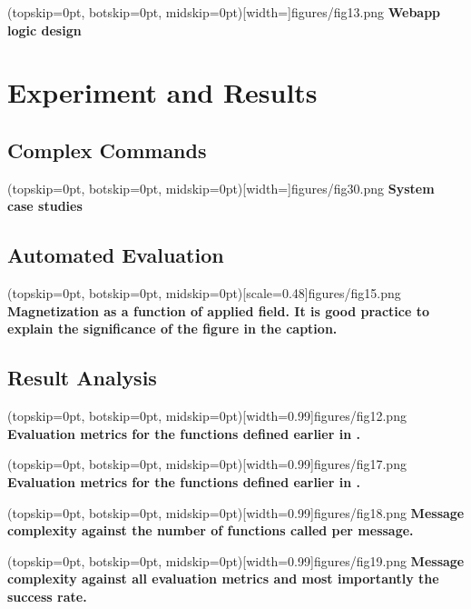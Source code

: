 \documentclass{ieeeaccess}
\begin{document}
\Figure[t!](topskip=0pt, botskip=0pt,
midskip=0pt)[width=\textwidth]{{figures/fig13.png}}
{ \textbf{Webapp logic design}\label{fig5}}

\section{Experiment and Results}
\label{sec:guidelines}

\subsection{Complex Commands}
\Figure[t!](topskip=0pt, botskip=0pt,
midskip=0pt)[width=\textwidth]{{figures/fig30.png}}
{ \textbf{System case studies}\label{fig6}}


\subsection{Automated Evaluation}
\Figure[t!](topskip=0pt, botskip=0pt, midskip=0pt)[scale=0.48]{{figures/fig15.png}}
{ \textbf{Magnetization as a function of applied field.
It is good practice to explain the significance of the figure in the caption.}\label{fig6}}
\subsection{Result Analysis}
\Figure[t!](topskip=0pt, botskip=0pt,
midskip=0pt)[width=0.99\columnwidth]{{figures/fig12.png}}
{ \textbf{Evaluation metrics for the functions defined earlier in .}\label{fig7}}


\Figure[t!](topskip=0pt, botskip=0pt,
midskip=0pt)[width=0.99\columnwidth]{{figures/fig17.png}}
{ \textbf{Evaluation metrics for the functions defined earlier in .}\label{fig7}}

\Figure[t!](topskip=0pt, botskip=0pt,
midskip=0pt)[width=0.99\columnwidth]{{figures/fig18.png}}
{ \textbf{Message complexity against the number of functions called per message.}\label{fig8}}

\Figure[t!](topskip=0pt, botskip=0pt,
midskip=0pt)[width=0.99\columnwidth]{{figures/fig19.png}}
{ \textbf{Message complexity against all evaluation metrics and most importantly the success rate.}\label{fig9}}


\end{document}
